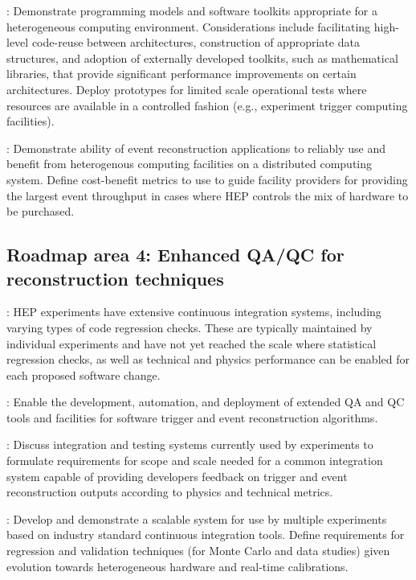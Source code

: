 \vskip 0.5cm
: Demonstrate programming models and software toolkits appropriate for a heterogeneous computing environment. Considerations include facilitating high-level 
code-reuse between architectures, construction of appropriate data structures, and adoption of externally developed toolkits, such as mathematical libraries, that provide significant performance 
improvements on certain architectures. Deploy prototypes for limited scale operational tests where resources are available in a controlled fashion (e.g., experiment trigger computing facilities).

\vskip 0.5cm
: Demonstrate ability of event reconstruction applications to reliably use and benefit from heterogenous computing facilities on a distributed computing system. 
Define cost-benefit metrics to use to guide facility providers for providing the largest event throughput in cases where HEP controls the mix of hardware to be purchased.

\subsection{Roadmap area 4: Enhanced QA/QC for reconstruction techniques}
: HEP experiments have extensive continuous integration systems, including varying types of code regression checks. These are typically maintained by individual experiments 
and have not yet reached the scale where statistical regression checks, as well as technical and physics performance can be enabled for each proposed software change.

\vskip 0.5cm
: Enable the development, automation, and deployment of extended QA and QC tools and facilities for software trigger and event reconstruction algorithms. 

\vskip 0.5cm
: Discuss integration and testing systems currently used by experiments to formulate requirements for scope and scale needed for a common integration system 
capable of providing developers feedback on trigger and event reconstruction outputs according to physics and technical metrics.

\vskip 0.5cm
: Develop and demonstrate a scalable system for use by multiple experiments based on industry standard continuous integration tools. Define requirements for 
regression and validation techniques (for Monte Carlo and data studies) given evolution towards heterogeneous hardware and real-time calibrations.

